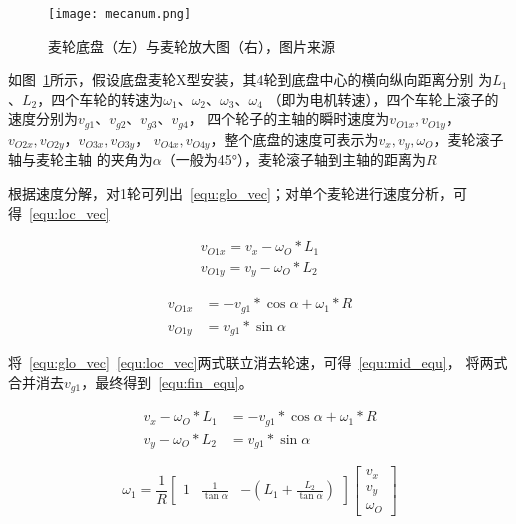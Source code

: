\begin{figure}[h] %
  \centering
  \texttt{[image: mecanum.png]}
  \caption{麦轮底盘（左）与麦轮放大图（右），图片来源\cite{mecanum}}
  \label{fig:mecanum}
\end{figure}

如图~\ref{fig:mecanum}所示，假设底盘麦轮X型安装，其4轮到底盘中心的横向纵向距离分别
为$L_1$、$L_2$，四个车轮的转速为$\omega_1$、$\omega_2$、$\omega_3$、$\omega_4$
（即为电机转速），四个车轮上滚子的速度分别为$v_{g1}$、$v_{g2}$、$v_{g3}$、$v_{g4}$，
四个轮子的主轴的瞬时速度为$v_{O1x}, v_{O1y}$，$v_{O2x}, v_{O2y}$，$v_{O3x}, v_{O3y}$，
$v_{O4x}, v_{O4y}$，整个底盘的速度可表示为$v_x, v_y, \omega_O$，麦轮滚子轴与麦轮主轴
的夹角为$\alpha$（一般为\ang{45}），麦轮滚子轴到主轴的距离为$R$

根据速度分解，对1轮可列出~\ref{equ:glo_vec}；对单个麦轮进行速度分析，可得~\ref{equ:loc_vec}

\begin{equation}
  \label{equ:glo_vec}
  \begin{aligned}
    v_{O1x} = v_x - \omega_O * L_1\\
    v_{O1y} = v_y - \omega_O * L_2
  \end{aligned}
\end{equation}

\begin{equation}
  \label{equ:loc_vec}
  \begin{aligned}
    v_{O1x} &= - v_{g1} * \cos\alpha + \omega_1 * R\\
    v_{O1y} &= v_{g1} * \sin\alpha
  \end{aligned}
\end{equation}

将~\ref{equ:glo_vec}~\ref{equ:loc_vec}两式联立消去轮速，可得~\ref{equ:mid_equ}，
将两式合并消去$v_{g1}$，最终得到~\ref{equ:fin_equ}。

\begin{equation}
  \label{equ:mid_equ}
  \begin{aligned}
    v_x - \omega_O * L_1 &= - v_{g1} * \cos\alpha + \omega_1 * R \\
    v_y - \omega_O * L_2 &= v_{g1} * \sin\alpha
  \end{aligned}
\end{equation}


\begin{equation}
  \label{equ:fin_equ}
  \omega_1 = \frac{1}{R}
    \begin{bmatrix}
      1 & \frac{1}{\tan\alpha} & -(L_1 + \frac{L_2}{\tan\alpha})
    \end{bmatrix}
    \begin{bmatrix}
      v_x \\
      v_y \\
      \omega_O
    \end{bmatrix}
\end{equation}

